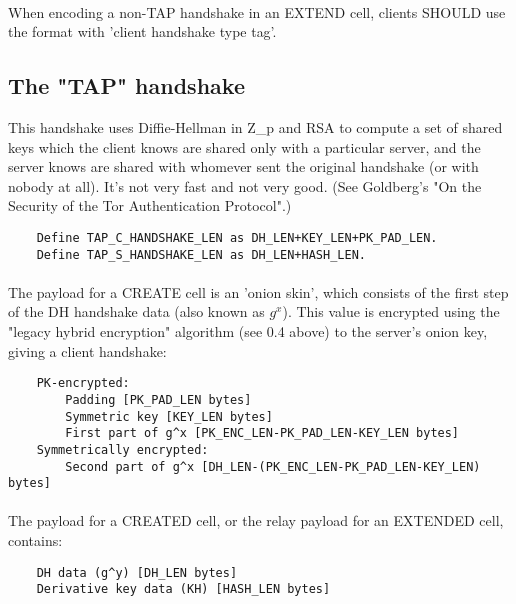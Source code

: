 \paragraph{}
When encoding a non-TAP handshake in an EXTEND cell, clients SHOULD
use the format with 'client handshake type tag'.

\subsection{The "TAP" handshake}
This handshake uses Diffie-Hellman in Z\_p and RSA to compute a set of
shared keys which the client knows are shared only with a particular
server, and the server knows are shared with whomever sent the
original handshake (or with nobody at all). It's not very fast and
not very good. (See Goldberg's "On the Security of the Tor
Authentication Protocol".)

\begin{verbatim}
    Define TAP_C_HANDSHAKE_LEN as DH_LEN+KEY_LEN+PK_PAD_LEN.
    Define TAP_S_HANDSHAKE_LEN as DH_LEN+HASH_LEN.
\end{verbatim}

\paragraph{}
The payload for a CREATE cell is an 'onion skin', which consists of
the first step of the DH handshake data (also known as $g^x$). This
value is encrypted using the "legacy hybrid encryption" algorithm
(see 0.4 above) to the server's onion key, giving a client handshake:

\begin{verbatim}
    PK-encrypted:
        Padding [PK_PAD_LEN bytes]
        Symmetric key [KEY_LEN bytes]
        First part of g^x [PK_ENC_LEN-PK_PAD_LEN-KEY_LEN bytes]
    Symmetrically encrypted:
        Second part of g^x [DH_LEN-(PK_ENC_LEN-PK_PAD_LEN-KEY_LEN) bytes]
\end{verbatim}

\paragraph{}
The payload for a CREATED cell, or the relay payload for an
EXTENDED cell, contains:

\begin{verbatim}
    DH data (g^y) [DH_LEN bytes]
    Derivative key data (KH) [HASH_LEN bytes]
\end{verbatim}


